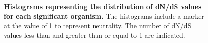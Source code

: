\documentclass{article}
\begin{document}
\begin{figure}[]
\centering
{}
\caption{\textbf{Histograms representing the distribution of dN/dS values for each significant organism.} The histograms include a marker at the value of 1 to represent neutrality. The number of dN/dS values less than and greater than or equal to 1 are indicated.}
\label{fig_5}
\end{figure}
\end{document}
